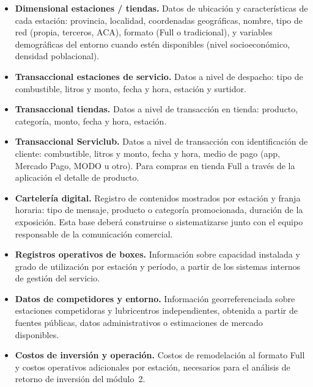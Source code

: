 \begin{itemize}

    \item \textbf{Dimensional estaciones / tiendas.} Datos de ubicación y 
    características de cada estación: provincia, localidad, coordenadas 
    geográficas, nombre, tipo de red (propia, terceros, ACA), formato 
    (Full o tradicional), y variables demográficas del entorno cuando 
    estén disponibles (nivel socioeconómico, densidad poblacional).

    \item \textbf{Transaccional estaciones de servicio.} Datos a nivel de 
    despacho: tipo de combustible, litros y monto, fecha y hora, estación 
    y surtidor.

    \item \textbf{Transaccional tiendas.} Datos a nivel de transacción en 
    tienda: producto, categoría, monto, fecha y hora, estación.

    \item \textbf{Transaccional Serviclub.} Datos a nivel de transacción con 
    identificación de cliente: combustible, litros y monto, fecha y hora, 
    medio de pago (app, Mercado Pago, MODO u otro). Para compras en tienda 
    Full a través de la aplicación el detalle de producto.

    \item \textbf{Cartelería digital.} Registro de contenidos mostrados por 
    estación y franja horaria: tipo de mensaje, producto o categoría 
    promocionada, duración de la exposición. Esta base deberá construirse 
    o sistematizarse junto con el equipo responsable de la comunicación 
    comercial.

    \item \textbf{Registros operativos de boxes.} Información sobre capacidad 
    instalada y grado de utilización por estación y período, a partir de 
    los sistemas internos de gestión del servicio.

    \item \textbf{Datos de competidores y entorno.} Información 
    georreferenciada sobre estaciones competidoras y lubricentros 
    independientes, obtenida a partir de fuentes públicas, datos 
    administrativos o estimaciones de mercado disponibles.

    \item \textbf{Costos de inversión y operación.} Costos de remodelación 
    al formato Full y costos operativos adicionales por estación, necesarios 
    para el análisis de retorno de inversión del módulo~2.

\end{itemize}